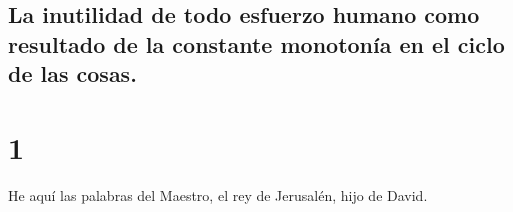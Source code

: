 \hypertarget{la-inutilidad-de-todo-esfuerzo-humano-como-resultado-de-la-constante-monotonuxeda-en-el-ciclo-de-las-cosas.}{%
\subsection{La inutilidad de todo esfuerzo humano como resultado de la
constante monotonía en el ciclo de las
cosas.}\label{la-inutilidad-de-todo-esfuerzo-humano-como-resultado-de-la-constante-monotonuxeda-en-el-ciclo-de-las-cosas.}}

\hypertarget{section}{%
\section{1}\label{section}}

 He aquí las palabras del Maestro, el rey de Jerusalén,
hijo de David.

